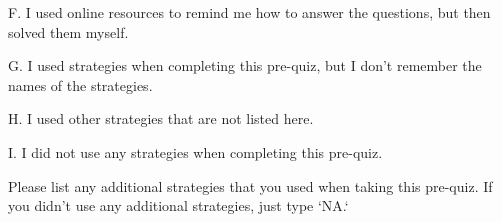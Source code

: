 \documentclass{ximera}
\begin{document}
\begin{question}
\begin{question}
    \begin{multipleChoice}
    \end{multipleChoice}
    
\end{question}
\begin{question}    
    
    F. I used online resources to remind me how to answer the questions, but then solved them myself.

    \begin{multipleChoice}
    \end{multipleChoice}
    
\end{question}
\begin{question}    
    
    G. I used strategies when completing this pre-quiz, but I don't remember the names of the strategies.

    \begin{multipleChoice}
    \end{multipleChoice}
    
\end{question}
\begin{question}    
    
    H. I used other strategies that are not listed here.

    \begin{multipleChoice}
    \end{multipleChoice}
    
\end{question}
\begin{question}    
    
    I. I did not use any strategies when completing this pre-quiz.

    \begin{multipleChoice}
    \end{multipleChoice}

\end{question}
\end{question}


\begin{question}
    Please list any additional strategies that you used when taking this pre-quiz. If you didn't use any additional strategies, just type `NA.`
   \begin{freeResponse}
   \end{freeResponse}
\end{question}



%
\end{document}
